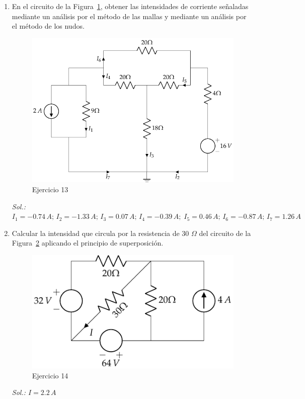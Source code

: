 \begin{enumerate}
\item En el circuito de la Figura~\ref{fig.ej12_BT1}, obtener las intensidades de
corriente señaladas mediante un análisis por el método de
las mallas y mediante un análisis por el método de los nudos.
\begin{figure}[H]
    \centering
    \includegraphics{../figs/ej12_BT1.pdf}
    \caption{Ejercicio 13}
    \label{fig.ej12_BT1}
\end{figure}

\emph{Sol.: $I_1=-0.74\,A;\,I_2=-1.33\,A;\,I_3=0.07\,A;\,I_4=-0.39\,A;\;I_5=0.46\,A;\,I_6=-0.87\,A;\,I_7=1.26\,A$}

\item Calcular la intensidad que circula por la resistencia de 30 $\Omega$ del circuito de la Figura~\ref{fig.ej16_BT1} aplicando el principio de superposición. 
\begin{figure}[H]
    \centering
    \includegraphics{../figs/ej16_BT1.pdf}
    \caption{Ejercicio 14}
    \label{fig.ej16_BT1}
\end{figure}
\emph{Sol.: $I=2.2\,A$}


\end{enumerate}
